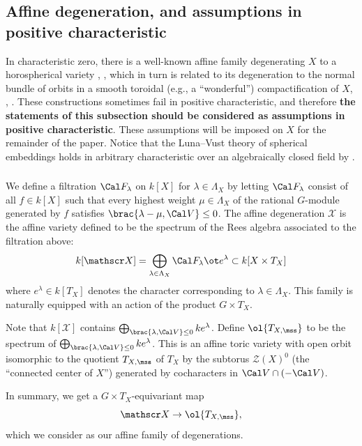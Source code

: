 \subsection{Affine degeneration, and assumptions in positive characteristic} \label{sect:affine-degeneration}  \label{assumptions-finitefield}

In characteristic zero, there is a well-known affine family degenerating $X$ to a horospherical variety \cite{Pop86}, \cite[\S 5.1]{GN}, which in turn is related to its degeneration to the normal bundle of orbits in a smooth toroidal (e.g., a ``wonderful'') compactification of $X$,
\cite{Brion07}, \cite[\S 2.5]{SV}. These constructions sometimes fail in positive characteristic, and therefore \textbf{the statements of this subsection should be considered as assumptions in positive characteristic}. These assumptions will be imposed on $X$ for the remainder of the paper. Notice that the Luna--Vust theory of spherical embeddings holds in arbitrary characteristic over an algebraically closed field by \cite{KnLV}.


\subsubsection{}
We define a filtration $\Cal F_{\lambda}$ on $k[X]$ for $\lambda \in \Lambda_X$
by letting $\Cal F_{\lambda}$ consist of all $f \in k[X]$
such that every highest weight $\mu \in \Lambda_X$ of the rational $G$-module
generated by $f$ satisfies $\brac{\lambda-\mu, \Cal V} \le 0$.
The affine degeneration $\mathscr X$ is the affine variety defined to be the
spectrum of the Rees algebra associated to the filtration above:
\[ k[\mathscr X] = \bigoplus_{\lambda\in \Lambda_X} \Cal F_\lambda \ot e^\lambda \subset k[X \times T_X]
\]
where $e^\lambda \in k[T_X]$ denotes the character corresponding to $\lambda \in \Lambda_X$. This family is naturally equipped with an action of the product $G\times T_X$.

Note that $k[\mathscr X]$ contains $\bigoplus_{\brac{\lambda,\Cal V}\le 0} k e^\lambda$.
Define $\ol{T_{X,\mss}}$ to be the spectrum of $\bigoplus_{\brac{\lambda,\Cal V}\le 0} k e^\lambda$.
This is an affine toric variety with open orbit isomorphic to the
quotient $T_{X,\mss}$ of $T_X$ by the subtorus $\mathcal Z(X)^0$ (the ``connected center of $X$'') generated by cocharacters in $\Cal V \cap (-\Cal V)$.

In summary, we get a $G \times T_X$-equivariant map
\[ \mathscr X \to \ol{T_{X,\mss}}, \]
which we consider as our affine family of degenerations.

